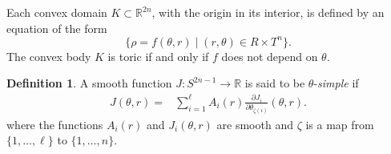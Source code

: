 \documentclass[12pt]{amsart}
\newtheorem{lemma}[theorem]{Lemma}
\theoremstyle{definition}
\newtheorem{definition}[theorem]{Definition}
\newcommand{\RR}{{\mathbb R}}
\begin{document}

Each convex domain $K \subset \RR^{2n}$, with the origin in its interior, is defined by an equation of the form $$\{\rho = f(\theta, r) \mid (r, \theta) \in R \times T^n\}.$$ The convex body $K$ is toric if and only if $f$ does not depend on $\theta$.

\begin{definition}
A smooth function $J \colon S^{2n-1} \to \RR$ is said to be $\theta$-{\em simple} if 
\begin{align*}
J(\theta,r) =& \sum_{i=1}^\ell A_i(r)\frac{\partial J_i}{\partial \theta_{\zeta(i)}}(\theta,r).
\end{align*}
where the functions $A_i(r)$ and $J_i(\theta,r)$ are smooth and $\zeta$ is a map from $\{1, \dots, \ell\}$ to $\{1, \dots, n\}$.
\end{definition}
\end{document}
